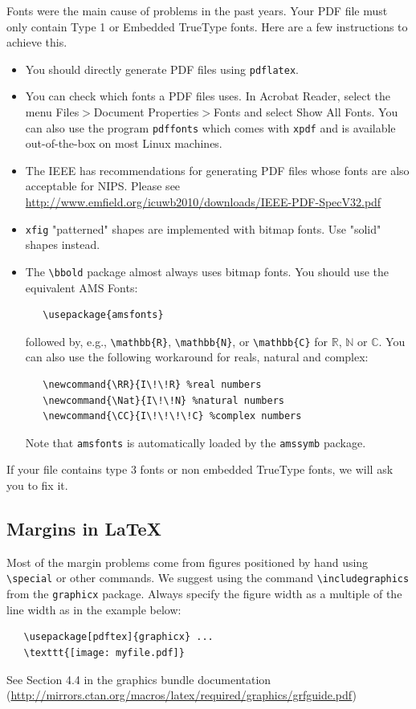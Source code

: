 \documentclass{article}
\begin{document}
Fonts were the main cause of problems in the past years. Your PDF file
must only contain Type 1 or Embedded TrueType fonts. Here are a few
instructions to achieve this.

\begin{itemize}

\item You should directly generate PDF files using \verb+pdflatex+.

\item You can check which fonts a PDF files uses.  In Acrobat Reader,
  select the menu Files$>$Document Properties$>$Fonts and select Show
  All Fonts. You can also use the program \verb+pdffonts+ which comes
  with \verb+xpdf+ and is available out-of-the-box on most Linux
  machines.

\item The IEEE has recommendations for generating PDF files whose
  fonts are also acceptable for NIPS. Please see
  \url{http://www.emfield.org/icuwb2010/downloads/IEEE-PDF-SpecV32.pdf}

\item \verb+xfig+ "patterned" shapes are implemented with bitmap
  fonts.  Use "solid" shapes instead.

\item The \verb+\bbold+ package almost always uses bitmap fonts.  You
  should use the equivalent AMS Fonts:
\begin{verbatim}
   \usepackage{amsfonts}
\end{verbatim}
followed by, e.g., \verb+\mathbb{R}+, \verb+\mathbb{N}+, or
\verb+\mathbb{C}+ for $\mathbb{R}$, $\mathbb{N}$ or $\mathbb{C}$.  You
can also use the following workaround for reals, natural and complex:
\begin{verbatim}
   \newcommand{\RR}{I\!\!R} %real numbers
   \newcommand{\Nat}{I\!\!N} %natural numbers
   \newcommand{\CC}{I\!\!\!\!C} %complex numbers
\end{verbatim}
Note that \verb+amsfonts+ is automatically loaded by the
\verb+amssymb+ package.

\end{itemize}

If your file contains type 3 fonts or non embedded TrueType fonts, we
will ask you to fix it.

\subsection{Margins in \LaTeX{}}

Most of the margin problems come from figures positioned by hand using
\verb+\special+ or other commands. We suggest using the command
\verb+\includegraphics+ from the \verb+graphicx+ package. Always
specify the figure width as a multiple of the line width as in the
example below:
\begin{verbatim}
   \usepackage[pdftex]{graphicx} ...
   \texttt{[image: myfile.pdf]}
\end{verbatim}
See Section 4.4 in the graphics bundle documentation
(\url{http://mirrors.ctan.org/macros/latex/required/graphics/grfguide.pdf})
\end{document}
